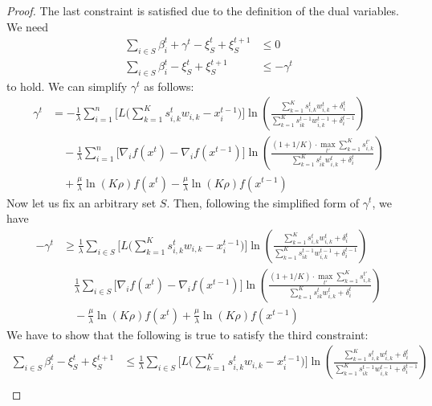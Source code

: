 \begin{proof}
The last constraint is satisfied due to the definition of the dual variables. We need
\begin{align*}
  \sum_{i \in S}\beta_{i}^{t} + \gamma^{t} - \xi_{S}^{t} + \xi_{S}^{t+1}  &\leq 0\\
  \sum_{i \in S}\beta_{i}^{t} - \xi_{S}^{t} + \xi_{S}^{t+1}  &\leq -\gamma^{t}
\end{align*}
%
to hold. We can simplify $\gamma^{t}$ as follows:
\begin{align*}
    \gamma^{t} &= -  \frac{1}{\lambda} \sum_{i=1}^{n} \biggl[ L\biggl( \sum_{k=1}^{K} s_{i,k}^{t} w_{i,k}  - x_{i}^{t-1} \biggr) \biggr]  \ln \left( \frac{\sum_{k=1}^{K} s_{i,k}^{t} w_{i,k}^{t} + \delta_{i}^{t}}{\sum_{k=1}^{K}  s_{ik}^{t-1}w_{i,k}^{t-1}  + \delta_{i}^{t-1}} \right) \\
    	& \quad - \frac{1}{\lambda} \sum_{i=1}^{n} \biggl[ \nabla_{i} f(x^{t}) - \nabla_{i} f(x^{t-1}) \biggr] \ln \left( \frac{(1 + 1/K) \cdot \max_{t'} \sum_{k=1}^{K} s_{i,k}^{t'}}{\sum_{k=1}^{K}  s_{ik}^{t}w_{i,k}^{t}  + \delta_{i}^{t}} \right)  \\
	& \quad + \frac{\mu}{\lambda} \ln(K\rho) f(x^{t}) - \frac{\mu}{\lambda} \ln(K\rho) f(x^{t-1})
\end{align*}
%
Now let us fix an arbitrary set $S$. Then, following the simplified form of $\gamma^t$, we have
\begin{align*}
    -\gamma^{t} &\geq     \frac{1}{\lambda} \sum_{i \in S} \biggl[ L\biggl( \sum_{k=1}^{K} s_{i,k}^{t} w_{i,k}  - x_{i}^{t-1} \biggr) \biggr]  \ln \left( \frac{\sum_{k=1}^{K} s_{i,k}^{t} w_{i,k}^{t} + \delta_{i}^{t}}{\sum_{k=1}^{K}  s_{ik}^{t-1}w_{i,k}^{t-1}  + \delta_{i}^{t-1}} \right) \\
            & \quad  \frac{1}{\lambda} \sum_{i \in S} \biggl[ \nabla_{i} f(x^{t}) - \nabla_{i} f(x^{t-1}) \biggr] \ln \left( \frac{(1 + 1/K) \cdot \max_{t'} \sum_{k=1}^{K} s_{i,k}^{t'}}{\sum_{k=1}^{K}  s_{ik}^{t}w_{i,k}^{t}  + \delta_{i}^{t}} \right)  \\
        & \quad - \frac{\mu}{\lambda} \ln(K\rho) f(x^{t}) + \frac{\mu}{\lambda} \ln(K\rho) f(x^{t-1})
\end{align*}
%
We have to show that the following is true to satisfy the third constraint:
\begin{align*}
    \sum_{i \in S}\beta_{i}^{t} - \xi_{S}^{t} + \xi_{S}^{t+1}  &\leq     \frac{1}{\lambda} \sum_{i \in S} \biggl[ L\biggl( \sum_{k=1}^{K} s_{i,k}^{t} w_{i,k}  - x_{i}^{t-1} \biggr) \biggr]  \ln \left( \frac{\sum_{k=1}^{K} s_{i,k}^{t} w_{i,k}^{t} + \delta_{i}^{t}}{\sum_{k=1}^{K}  s_{ik}^{t-1}w_{i,k}^{t-1}  + \delta_{i}^{t-1}} \right) \\

\end{align*}
\end{proof}
